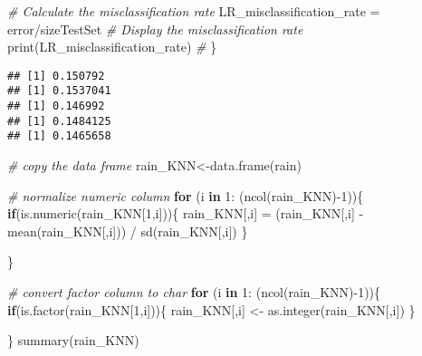 \documentclass[
]{article}
\newenvironment{Shaded}{\begin{snugshade}}{\end{snugshade}}
\newcommand{\AttributeTok}[1]{\textcolor[rgb]{0.77,0.63,0.00}{#1}}
\newcommand{\CommentTok}[1]{\textcolor[rgb]{0.56,0.35,0.01}{\textit{#1}}}
\newcommand{\ControlFlowTok}[1]{\textcolor[rgb]{0.13,0.29,0.53}{\textbf{#1}}}
\newcommand{\DecValTok}[1]{\textcolor[rgb]{0.00,0.00,0.81}{#1}}
\newcommand{\FunctionTok}[1]{\textcolor[rgb]{0.00,0.00,0.00}{#1}}
\newcommand{\NormalTok}[1]{#1}
\newcommand{\OtherTok}[1]{\textcolor[rgb]{0.56,0.35,0.01}{#1}}
\newcommand{\SpecialCharTok}[1]{\textcolor[rgb]{0.00,0.00,0.00}{#1}}
\begin{document}
\begin{Shaded}
\begin{Highlighting}[]
    \CommentTok{\# Calculate the misclassification rate}
\NormalTok{    LR\_misclassification\_rate }\OtherTok{=}\NormalTok{ error}\SpecialCharTok{/}\NormalTok{sizeTestSet}
    \CommentTok{\# Display the misclassification rate}
    \FunctionTok{print}\NormalTok{(LR\_misclassification\_rate) }\CommentTok{\# }
\NormalTok{\}}
\end{Highlighting}
\end{Shaded}

\begin{verbatim}
## [1] 0.150792
## [1] 0.1537041
## [1] 0.146992
## [1] 0.1484125
## [1] 0.1465658
\end{verbatim}

\begin{Shaded}
\end{Shaded}

\begin{Shaded}
\begin{Highlighting}[]
\CommentTok{\# copy the data frame}
\NormalTok{rain\_KNN}\OtherTok{\textless{}{-}}\FunctionTok{data.frame}\NormalTok{(rain)}

\CommentTok{\# normalize numeric column}
\ControlFlowTok{for}\NormalTok{ (i }\ControlFlowTok{in} \DecValTok{1}\SpecialCharTok{:}\NormalTok{ (}\FunctionTok{ncol}\NormalTok{(rain\_KNN)}\SpecialCharTok{{-}}\DecValTok{1}\NormalTok{))\{}
    \ControlFlowTok{if}\NormalTok{(}\FunctionTok{is.numeric}\NormalTok{(rain\_KNN[}\DecValTok{1}\NormalTok{,i]))\{}
\NormalTok{        rain\_KNN[,i] }\OtherTok{=}\NormalTok{ (rain\_KNN[,i] }\SpecialCharTok{{-}} \FunctionTok{mean}\NormalTok{(rain\_KNN[,i])) }\SpecialCharTok{/} \FunctionTok{sd}\NormalTok{(rain\_KNN[,i])}
\NormalTok{    \}}
  
\NormalTok{\}}

\CommentTok{\# convert factor column to char}
\ControlFlowTok{for}\NormalTok{ (i }\ControlFlowTok{in} \DecValTok{1}\SpecialCharTok{:}\NormalTok{ (}\FunctionTok{ncol}\NormalTok{(rain\_KNN)}\SpecialCharTok{{-}}\DecValTok{1}\NormalTok{))\{}
    \ControlFlowTok{if}\NormalTok{(}\FunctionTok{is.factor}\NormalTok{(rain\_KNN[}\DecValTok{1}\NormalTok{,i]))\{}
\NormalTok{        rain\_KNN[,i] }\OtherTok{\textless{}{-}} \FunctionTok{as.integer}\NormalTok{(rain\_KNN[,i])}
\NormalTok{    \}}
  
\NormalTok{\}}
\FunctionTok{summary}\NormalTok{(rain\_KNN)}
\end{Highlighting}
\end{Shaded}
\end{document}
